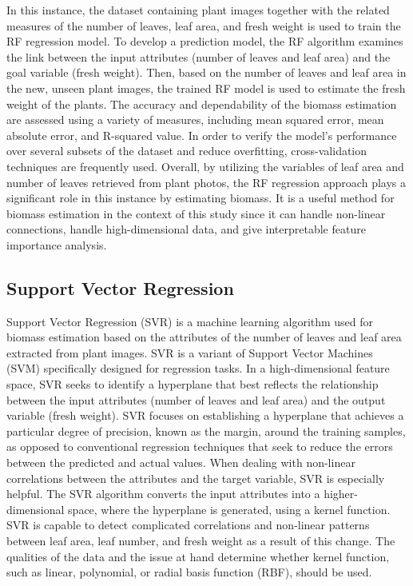\documentclass[a4paper,11pt]{report}%
\renewcommand{\\}{\vspace*{0.5\baselineskip} \newline}
\begin{document}
\noindent In this instance, the dataset containing plant images together with the related measures of the number of leaves, leaf area, and fresh weight is used to train the RF regression model. To develop a prediction model, the RF algorithm examines the link between the input attributes (number of leaves and leaf area) and the goal variable (fresh weight). Then, based on the number of leaves and leaf area in the new, unseen plant images, the trained RF model is used to estimate the fresh weight of the plants.
The accuracy and dependability of the biomass estimation are assessed using a variety of measures, including mean squared error, mean absolute error, and R-squared value. In order to verify the model's performance over several subsets of the dataset and reduce overfitting, cross-validation techniques are frequently used.
Overall, by utilizing the variables of leaf area and number of leaves retrieved from plant photos, the RF regression approach plays a significant role in this instance by estimating biomass. It is a useful method for biomass estimation in the context of this study since it can handle non-linear connections, handle high-dimensional data, and give interpretable feature importance analysis.

\subsection{Support Vector Regression}
Support Vector Regression (SVR) is a machine learning algorithm used for biomass estimation based on the attributes of the number of leaves and leaf area extracted from plant images. SVR is a variant of Support Vector Machines (SVM) specifically designed for regression tasks.
In a high-dimensional feature space, SVR seeks to identify a hyperplane that best reflects the relationship between the input attributes (number of leaves and leaf area) and the output variable (fresh weight). SVR focuses on establishing a hyperplane that achieves a particular degree of precision, known as the margin, around the training samples, as opposed to conventional regression techniques that seek to reduce the errors between the predicted and actual values. When dealing with non-linear correlations between the attributes and the target variable, SVR is especially helpful.
The SVR algorithm converts the input attributes into a higher-dimensional space, where the hyperplane is generated, using a kernel function. SVR is capable to detect complicated correlations and non-linear patterns between leaf area, leaf number, and fresh weight as a result of this change. The qualities of the data and the issue at hand determine whether kernel function, such as linear, polynomial, or radial basis function (RBF), should be used.
\end{document}
